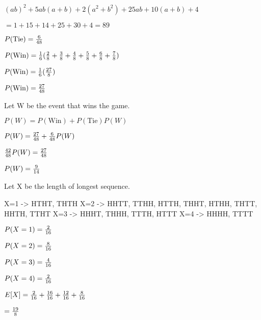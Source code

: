 \documentclass[12pt]{article}
\begin{document}
{    $ (ab)^2 + 5ab(a+b) +2(a^2+b^2) + 25ab + 10(a+b) + 4 $

    $ = 1 + 15 + 14 + 25 + 30 + 4 = 89 $

\hr

    $ P(\text{Tie}) = \frac{6}{48} $

    $ P(\text{Win}) = \frac{1}{6}(\frac{2}{8} + \frac{3}{8} + \frac{4}{8} + \frac{5}{8} + \frac{6}{8} + \frac{7}{8}) $

    $ P(\text{Win}) = \frac{1}{6}(\frac{27}{8}) $

    $ P(\text{Win}) = \frac{27}{48} $

    Let W be the event that wins the game.

    $ P(W) = P(\text{Win}) + P(\text{Tie})P(W) $

    $ P(W) = \frac{27}{48} + \frac{6}{48}P(W) $
    
    $ \frac{42}{48}P(W) = \frac{27}{48} $

    $ P(W) = \frac{9}{14} $

\hr

    Let X be the length of longest sequence.

    X=1 -> HTHT, THTH
    X=2 -> HHTT, TTHH, HTTH, THHT, HTHH, THTT, HHTH, TTHT
    X=3 -> HHHT, THHH, TTTH, HTTT
    X=4 -> HHHH, TTTT

    $ P(X=1) = \frac{2}{16} $

    $ P(X=2) = \frac{8}{16} $

    $ P(X=3) = \frac{4}{16} $

    $ P(X=4) = \frac{2}{16} $

    $ E[X] = \frac{2}{16} + \frac{16}{16} + \frac{12}{16} + \frac{8}{16} $

    $ = \frac{19}{8} $
}
\end{document}
